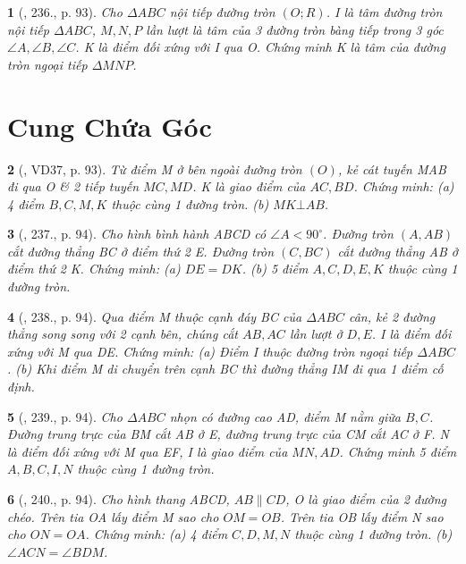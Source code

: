 \documentclass{article}
\newtheorem{baitoan}{}
\begin{document}
\begin{baitoan}[\cite{Binh_Toan_9_tap_2}, 236., p. 93]
	Cho $\Delta ABC$ nội tiếp đường tròn $(O;R)$. I là tâm đường tròn nội tiếp $\Delta ABC$, $M,N,P$ lần lượt là tâm của 3 đường tròn bàng tiếp trong 3 góc $\angle{A},\angle{B},\angle{C}$. K là điểm đối xứng với I qua O. Chứng minh K là tâm của đường tròn ngoại tiếp $\Delta MNP$.
\end{baitoan}


\section{Cung Chứa Góc}

\begin{baitoan}[\cite{Binh_Toan_9_tap_2}, VD37, p. 93]
	Từ điểm M ở bên ngoài đường tròn $(O)$, kẻ cát tuyến MAB đi qua O \& 2 tiếp tuyến $MC,MD$. K là giao điểm của $AC,BD$. Chứng minh: (a) 4 điểm $B,C,M,K$ thuộc cùng 1 đường tròn. (b) $MK\bot AB$.
\end{baitoan}

\begin{baitoan}[\cite{Binh_Toan_9_tap_2}, 237., p. 94]
	Cho hình bình hành ABCD có $\angle{A} < 90^\circ$. Đường tròn $(A,AB)$ cắt đường thẳng BC ở điểm thứ 2 E. Đường tròn $(C,BC)$ cắt đường thẳng AB ở điểm thứ 2 K. Chứng minh: (a) $DE = DK$. (b) 5 điểm $A,C,D,E,K$ thuộc cùng 1 đường tròn.
\end{baitoan}

\begin{baitoan}[\cite{Binh_Toan_9_tap_2}, 238., p. 94]
	Qua điểm M thuộc cạnh đáy BC của $\Delta ABC$ cân, kẻ 2 đường thẳng song song với 2 cạnh bên, chúng cắt $AB,AC$ lần lượt ở $D,E$. I là điểm đối xứng với M qua DE. Chứng minh: (a) Điểm I thuộc đường tròn ngoại tiếp $\Delta ABC$. (b) Khi điểm M di chuyển trên cạnh BC thì đường thẳng IM đi qua 1 điểm cố định.
\end{baitoan}

\begin{baitoan}[\cite{Binh_Toan_9_tap_2}, 239., p. 94]
	Cho $\Delta ABC$ nhọn có đường cao AD, điểm M nằm giữa $B,C$. Đường trung trực của BM cắt AB ở E, đường trung trực của CM cắt AC ở F. N là điểm đối xứng với M qua EF, I là giao điểm của $MN,AD$. Chứng minh 5 điểm $A,B,C,I,N$ thuộc cùng 1 đường tròn.
\end{baitoan}

\begin{baitoan}[\cite{Binh_Toan_9_tap_2}, 240., p. 94]
	Cho hình thang ABCD, $AB\parallel CD$, O là giao điểm của 2 đường chéo. Trên tia OA lấy điểm M sao cho $OM = OB$. Trên tia OB lấy điểm N sao cho $ON = OA$. Chứng minh: (a) 4 điểm $C,D,M,N$ thuộc cùng 1 đường tròn. (b) $\angle{ACN} = \angle{BDM}$.
\end{baitoan}
\end{document}
